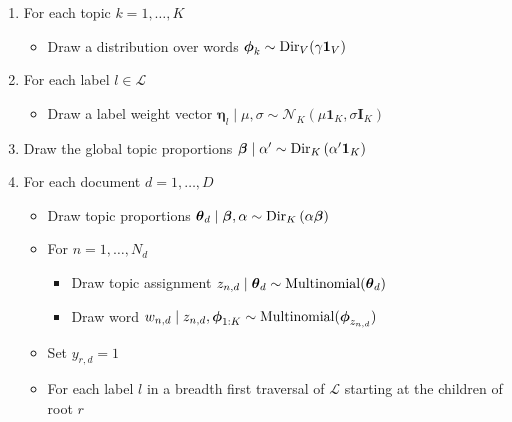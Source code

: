 \begin{shortbox}
\begin{enumerate}
\item For each topic $k=1,\ldots,K$

\begin{itemize}
\item Draw a distribution over words $\boldsymbol\phi_{k}\sim{\rm Dir}_{V}(\gamma\mathbf{1}_V)$%
\end{itemize}
\item For each label $l\in\mathcal{L}$

\begin{itemize}
\item Draw a label weight vector $\boldsymbol\eta_{l}\mid\mu,\sigma\sim\mathcal{N}_{K}(\mu \mathbf{1}_K,\sigma \mathbf{I}_{K})$  
\end{itemize}
\item Draw the global topic proportions $\boldsymbol\beta\mid\alpha'\sim{\rm Dir}_{K}\left(\alpha^{\prime}\mathbf{1}_K\right)$
\item For each document $d=1,\ldots,D$

\begin{itemize}
\item Draw topic proportions $\boldsymbol\theta_d\mid\boldsymbol\beta,\alpha\sim{\rm Dir}_{K}\left(\alpha\boldsymbol\beta\right)$ 
\item For $n=1,\ldots,N_{d}$

\begin{itemize}
\item Draw topic assignment $z_{n,d}\mid\boldsymbol\theta_d\sim{\rm Multinomial}(\boldsymbol\theta_d)$ 
\item Draw word $w_{n,d}\mid z_{n,d},\boldsymbol\phi_{1:K}\sim{\rm Multinomial}(\boldsymbol\phi_{z_{n,d}})$ 
\end{itemize}
\item Set $y_{r,d} = 1$
\item For each label $l$ in a breadth first traversal of $\mathcal{L}$ starting at the children of  root $r$


\end{itemize}
\end{enumerate}
\end{shortbox}
